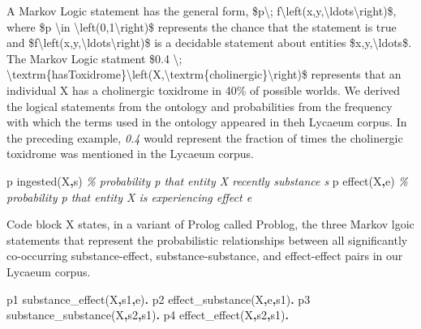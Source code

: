 \documentclass[
]{article}
\newenvironment{Shaded}{}{}
\newcommand{\CommentTok}[1]{\textcolor[rgb]{0.38,0.63,0.69}{\textit{#1}}}
\newcommand{\DataTypeTok}[1]{\textcolor[rgb]{0.56,0.13,0.00}{#1}}
\newcommand{\KeywordTok}[1]{\textcolor[rgb]{0.00,0.44,0.13}{\textbf{#1}}}
\newcommand{\NormalTok}[1]{#1}
\begin{document}
A Markov Logic statement has the general form, \$p\textbackslash;
f\textbackslash left(x,y,\textbackslash ldots\textbackslash right)\$,
where \$p \textbackslash in
\textbackslash left(0,1\textbackslash right)\$ represents the chance
that the statement is true and
\$f\textbackslash left(x,y,\textbackslash ldots\textbackslash right)\$
is a decidable statement about entities \$x,y,\textbackslash ldots\$.
The Markov Logic statment \$0.4 \textbackslash;
\textbackslash textrm\{hasToxidrome\}\textbackslash left(X,\textbackslash textrm\{cholinergic\}\textbackslash right)\$
represents that an individual X has a cholinergic toxidrome in 40\% of
possible worlds. We derived the logical statements from the ontology and
probabilities from the frequency with which the terms used in the
ontology appeared in theh Lycaeum corpus. In the preceding example,
\emph{0.4} would represent the fraction of times the cholinergic
toxidrome was mentioned in the Lycaeum corpus.

\begin{Shaded}
\begin{Highlighting}[]
\NormalTok{p ingested(}\DataTypeTok{X}\KeywordTok{,}\NormalTok{s) }\CommentTok{\% probability p that entity X recently substance s}
\NormalTok{p effect(}\DataTypeTok{X}\KeywordTok{,}\NormalTok{e) }\CommentTok{\% probability p that entity X is experiencing effect e}
\end{Highlighting}
\end{Shaded}

Code block X states, in a variant of Prolog called Problog, the three
Markov lgoic statements that represent the probabilistic relationships
between all significantly co-occurring substance-effect,
substance-substance, and effect-effect pairs in our Lycaeum corpus.

\begin{Shaded}
\begin{Highlighting}[]
\NormalTok{ p1 substance\_effect(}\DataTypeTok{X}\KeywordTok{,}\NormalTok{s1}\KeywordTok{,}\NormalTok{e)}\KeywordTok{.}
\NormalTok{ p2 effect\_substance(}\DataTypeTok{X}\KeywordTok{,}\NormalTok{e}\KeywordTok{,}\NormalTok{s1)}\KeywordTok{.}
\NormalTok{ p3 substance\_substance(}\DataTypeTok{X}\KeywordTok{,}\NormalTok{s2}\KeywordTok{,}\NormalTok{s1)}\KeywordTok{.}
\NormalTok{ p4 effect\_effect(}\DataTypeTok{X}\KeywordTok{,}\NormalTok{s2}\KeywordTok{,}\NormalTok{s1)}\KeywordTok{.}
\end{Highlighting}
\end{Shaded}
\end{document}
